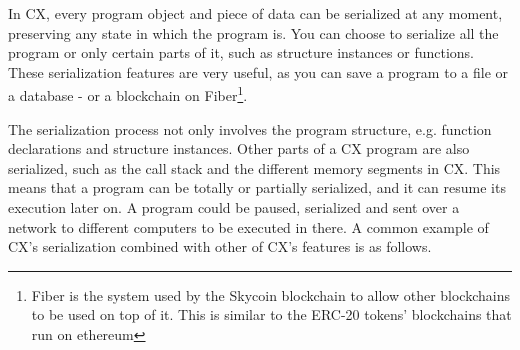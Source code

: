 \documentclass[11pt,fleqn,openany]{book} %
\begin{document}

In CX, every program object and piece of data can be serialized at any moment, preserving any state in which the program is. You can choose to serialize all the program or only certain parts of it, such as structure instances or functions. These serialization features are very useful, as you can save a program to a file or a database - or a blockchain on Fiber\footnote{Fiber is the system used by the Skycoin blockchain to allow other blockchains to be used on top of it. This is similar to the ERC-20 tokens' blockchains that run on ethereum}.

The serialization process not only involves the program structure, e.g. function declarations and structure instances. Other parts of a CX program are also serialized, such as the call stack and the different memory segments in CX. This means that a program can be totally or partially serialized, and it can resume its execution later on. A program could be paused, serialized and sent over a network to different computers to be executed in there. A common example of CX's serialization combined with other of CX's features is as follows.
\end{document}
